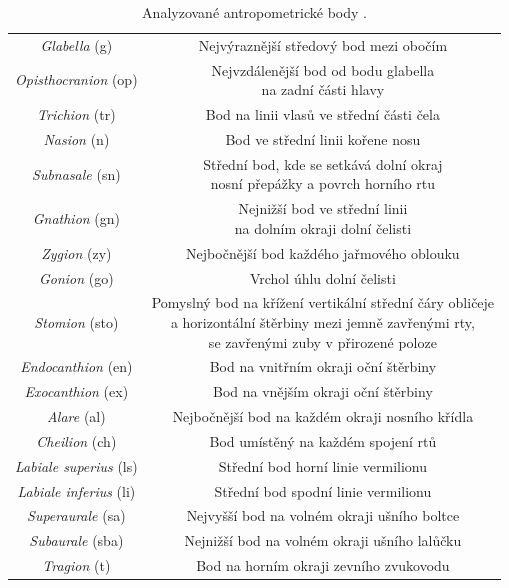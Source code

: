 \begin{table}[H]
    \centering
    \renewcommand{\arraystretch}{1.5}
    \begin{tabular}{|c|c|}
        \hline
        \textit{Glabella} (g) &  Nejvýraznější středový bod mezi obočím \\
        \textit{Opisthocranion} (op) & \makecell{Nejvzdálenější bod od bodu glabella\\
                                                    na zadní části hlavy} \\
        \textit{Trichion} (tr) & Bod na linii vlasů ve střední části čela \\
        \textit{Nasion} (n) & Bod ve střední linii kořene nosu \\
        \textit{Subnasale} (sn) & \makecell{Střední bod, kde se setkává dolní okraj \\
                                            nosní přepážky a povrch horního rtu} \\
        \textit{Gnathion} (gn) & \makecell{Nejnižší bod ve střední linii \\
                                            na dolním okraji dolní čelisti} \\
        \textit{Zygion} (zy) & Nejbočnější bod každého jařmového oblouku \\
        \textit{Gonion} (go) & Vrchol úhlu dolní čelisti \\
        \textit{Stomion} (sto) & \makecell{Pomyslný bod na křížení vertikální střední čáry obličeje \\
                                            a horizontální štěrbiny mezi jemně zavřenými rty, \\
                                            se zavřenými zuby v přirozené poloze} \\
        \textit{Endocanthion} (en) & Bod na vnitřním okraji oční štěrbiny \\
        \textit{Exocanthion} (ex) & Bod na vnějším okraji oční štěrbiny \\
        \textit{Alare} (al) & Nejbočnější bod na každém okraji nosního křídla \\
        \textit{Cheilion} (ch) & Bod umístěný na každém spojení rtů \\
        \textit{Labiale superius} (ls) & Střední bod horní linie vermilionu \\
        \textit{Labiale inferius} (li) & Střední bod spodní linie vermilionu \\
        \textit{Superaurale} (sa) & Nejvyšší bod na volném okraji ušního boltce \\
        \textit{Subaurale} (sba) & Nejnižší bod na volném okraji ušního lalůčku \\
        \textit{Tragion} (t) & Bod na horním okraji zevního zvukovodu \\
        \hline
    \end{tabular}
    \caption{Analyzované antropometrické body \cite{Zacharopoulos2016}.}
    \label{tab:landmarks}
\end{table}

